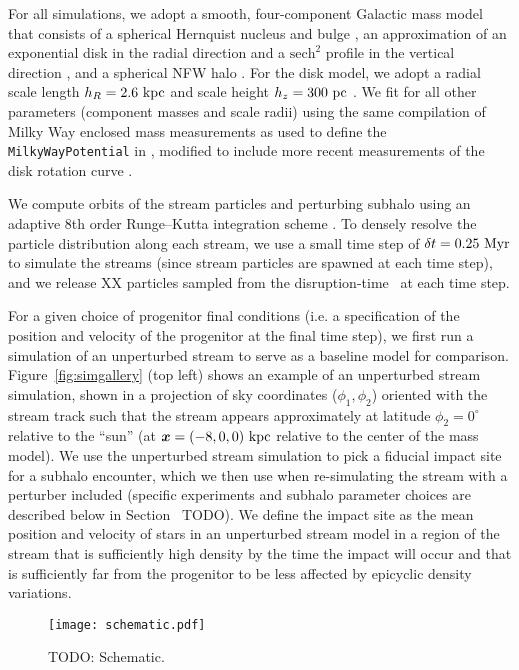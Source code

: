 For all simulations, we adopt a smooth, four-component Galactic mass model that consists
of a spherical Hernquist nucleus and bulge \citep{Hernquist:1992}, an approximation of
an exponential disk in the radial direction and a $\textrm{sech}^2$ profile in the
vertical direction \citep{Smith:2015}, and a spherical NFW halo \citep{Navarro:1996}.
For the disk model, we adopt a radial scale length $h_R = 2.6~\mathrm{kpc}$ and scale height
$h_z = 300~\mathrm{pc}$ \citep{Bland-Hawthorn:2016}.
We fit for all other parameters (component masses and scale radii) using the same
compilation of Milky Way enclosed mass measurements as used to define the
\texttt{MilkyWayPotential} in \gala \citep{gala}, modified to include more recent
measurements of the disk rotation curve \citep{Eilers:2019}.

We compute orbits of the stream particles and perturbing subhalo using an adaptive 8th
order Runge--Kutta integration scheme \citep{Hairer:1991}.
To densely resolve the particle distribution along each stream, we use a small time step
of $\delta t = 0.25~\mathrm{Myr}$ to simulate the streams (since stream particles are spawned at
each time step), and we release {\color{red} XX} particles sampled from the
disruption-time \df\ at each time step.

For a given choice of progenitor final conditions (i.e. a specification of the position
and velocity of the progenitor at the final time step), we first run a simulation of an
unperturbed stream to serve as a baseline model for comparison.
Figure~\ref{fig:simgallery} (top left) shows an example of an unperturbed stream
simulation, shown in a projection of sky coordinates ($\phi_1, \phi_2$) oriented with
the stream track such that the stream appears approximately at latitude $\phi_2=0^\circ$
relative to the ``sun'' (at $\boldsymbol{x} = (-8, 0, 0)~\mathrm{kpc}$ relative to the center of the
mass model).
We use the unperturbed stream simulation to pick a fiducial impact site for a subhalo
encounter, which we then use when re-simulating the stream with a perturber included
(specific experiments and subhalo parameter choices are described below in
Section~{\color{red} TODO}).
We define the impact site as the mean position and velocity of stars in an unperturbed
stream model in a region of the stream that is sufficiently high density by the time
the impact will occur and that is sufficiently far from the progenitor to be less
affected by epicyclic density variations.

\begin{figure*}[!t]
\begin{center}
\texttt{[image: schematic.pdf]}
\end{center}
\caption{%
TODO: Schematic.
\label{fig:schematic}
}
\end{figure*}

